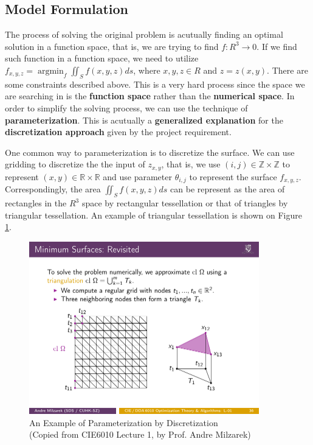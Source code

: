 \subsection{Model Formulation}
The process of solving the original problem is acutually finding an optimal solution in a function space, that is, we are trying to find $f: R^3 \rightarrow 0 $. If we find such function in a function space, we need to utilize $f_{x,y,z} = \mathop{\arg\min}_{f} \iint_{S} f(x,y,z) ds$, where $x,y,z \in R$ and $z=z(x,y)$. There are some constraints described above. This is a very hard process since the space we are searching in is the \textbf{function space} rather than the \textbf{numerical space}. In order to simplify the solving process, we can use the technique of \textbf{parameterization}. This is acutually a \textbf{generalized explanation} for the \textbf{discretization approach} given by the project requirement.

One common way to parameterization is to discretize the surface. We can use gridding to discretize the the input of $z_{x,y}$, that is, we use $(i,j) \in \mathbb{Z} \times \mathbb{Z}$ to represent $(x,y) \in \mathbb{R} \times \mathbb{R}$ and use parameter $\theta_{i,j}$ to represent the surface $f_{x,y,z}$. Correspondingly, the area $\iint_{S} f(x,y,z) ds$ can be represent as the area of rectangles in the $R^3$ space by rectangular tessellation or that of triangles by triangular tessellation. An example of triangular tessellation is shown on Figure \ref{fig:discretization}.

\begin{figure}[!htbp]
    \centering
      \includegraphics[width=10cm]{images/discretization.pdf}
      \caption{An Example of Parameterization by Discretization \\ (Copied from CIE6010 Lecture 1, by Prof. Andre Milzarek)}
      \label{fig:discretization}
\end{figure}

